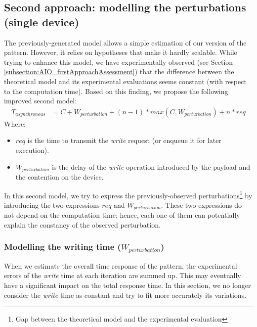 	\subsection{Second approach: modelling the perturbations (single \notationIO\space device)} \label{subsection:secondModel}
		The previously-generated model allows a simple estimation of our version of the \toolTargetSoftware\space pattern.   However, it relies on hypotheses that make it hardly scalable.
		While trying to enhance this model, we have experimentally observed (see Section \ref{subsection:AIO_firstApproachAssessment}) that the difference between the theoretical model and its experimental evaluations seems constant (with respect to the computation time).   Based on this finding, we propose the following improved second model:
			\begin{equation}
			\begin{aligned}
				T_{asynchronous}&= C + W_{perturbation} + (n-1) * max(C , W_{perturbation}) + n * req
			\end{aligned}
			\label{equation:model1}
			\end{equation}
		Where:
		\begin{itemize}
			\item $req$ is the time to transmit the \emph{write} request (or enqueue it for later execution).
			\item $W_{perturbation}$ is the delay of the \emph{write} operation introduced by the payload and the contention on the \notationIO\space device.
		\end{itemize}
		In this second model, we try to express the previously-observed perturbations\footnote{Gap between the theoretical model and the experimental evaluation} by introducing the two expressions $req$ and $W_{perturbation}$.   These two expressions do not depend on the computation time; hence, each one of them can potentially explain the constancy of the observed perturbation.\\

		\subsubsection{Modelling the writing time ($W_{perturbation}$)}\label{subsubsection:modelWritingTime}
			When we estimate the overall time response of the \toolTargetSoftware\space pattern, the experimental errors of the \emph{write} time at each iteration are summed up.   This may eventually have a significant impact on the total response time.  In this section, we no longer consider the \emph{write} time as constant and try to fit more accurately its variations.\\

